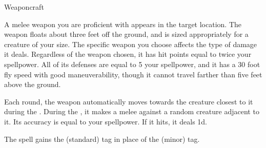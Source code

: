 \newpage
\begin{spellsection}{Weaponcraft}

\begin{spellheader}
\end{spellheader}

\begin{spellcontent}

\begin{spelltargetinginfo}




\end{spelltargetinginfo}


\begin{spelleffects}



\spelleffect
A melee weapon you are proficient with appears in the target location.
The weapon floats about three feet off the ground, and is sized appropriately for a creature of your size.
The specific weapon you choose affects the type of damage it deals.
Regardless of the weapon chosen, it has hit points equal to twice your spellpower.
All of its defenses are equal to 5 \add your spellpower, and it has a 30 foot fly speed with good maneuverability, though it cannot travel farther than five feet above the ground.

Each round, the weapon automatically moves towards the creature closest to it during the .
During the , it makes a melee  against a random creature adjacent to it.
Its accuracy is equal to your spellpower.
If it hits, it deals  \minus1d.








\end{spelleffects}

\end{spellcontent}
\begin{spellfooter}


\end{spellfooter}
\begin{spellsubcontent}


\begin{spellcantrip}
The spell gains the  (standard) tag in place of the  (minor) tag.
\end{spellcantrip}


\end{spellsubcontent}
\end{spellsection}


